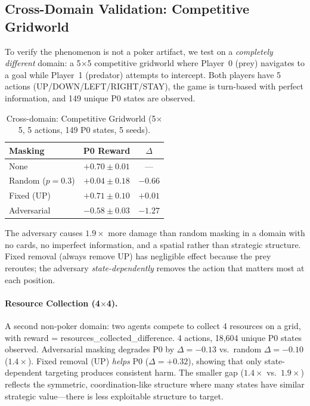 \documentclass{article}
\begin{document}
\subsection{Cross-Domain Validation: Competitive Gridworld}
\label{sec:crossdomain}

To verify the phenomenon is not a poker artifact, we test on a \emph{completely different} domain: a 5$\times$5 competitive gridworld where Player~0 (prey) navigates to a goal while Player~1 (predator) attempts to intercept. Both players have 5 actions (UP/DOWN/LEFT/RIGHT/STAY), the game is turn-based with perfect information, and 149 unique P0 states are observed.

\begin{table}[ht]
\centering
\caption{Cross-domain: Competitive Gridworld (5$\times$5, 5 actions, 149 P0 states, 5 seeds).}
\label{tab:gridworld}
\begin{tabular}{lcc}
\toprule
Masking & P0 Reward & $\Delta$ \\
\midrule
None & $+0.70 \pm 0.01$ & --- \\
Random ($p{=}0.3$) & $+0.04 \pm 0.18$ & $-0.66$ \\
Fixed (UP) & $+0.71 \pm 0.10$ & $+0.01$ \\
Adversarial & $\mathbf{-0.58 \pm 0.03}$ & $\mathbf{-1.27}$ \\
\bottomrule
\end{tabular}
\end{table}

The adversary causes $1.9\times$ more damage than random masking in a domain with no cards, no imperfect information, and a spatial rather than strategic structure. Fixed removal (always remove UP) has negligible effect because the prey reroutes; the adversary \emph{state-dependently} removes the action that matters most at each position.

\paragraph{Resource Collection (4$\times$4).}
A second non-poker domain: two agents compete to collect 4 resources on a grid, with reward = resources\_collected\_difference. 4 actions, 18,604 unique P0 states observed. Adversarial masking degrades P0 by $\Delta = -0.13$ vs.\ random $\Delta = -0.10$ ($1.4\times$). Fixed removal (UP) \emph{helps} P0 ($\Delta = +0.32$), showing that only state-dependent targeting produces consistent harm. The smaller gap ($1.4\times$ vs.\ $1.9\times$) reflects the symmetric, coordination-like structure where many states have similar strategic value---there is less exploitable structure to target.
\end{document}
